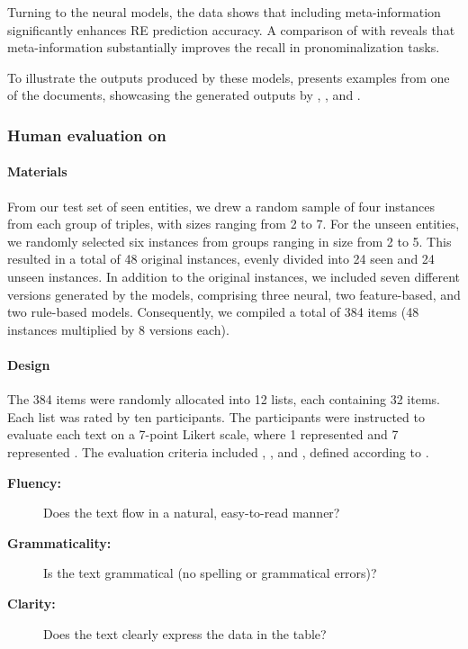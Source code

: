 

Turning to the neural models, the data shows that including meta-information significantly enhances RE prediction accuracy. A comparison of  with  reveals that meta-information substantially improves the recall in pronominalization tasks. 

To illustrate the outputs produced by these models,  presents examples from one of the \wsj documents, showcasing the generated outputs by , , and .

\subsubsection{Human evaluation on \webnlg}\label{subsubsec:webnlghum}

\paragraph*{Materials} 

From our test set of \webnlg seen entities, we drew a random sample of four instances from each group of triples, with sizes ranging from 2 to 7. For the unseen entities, we randomly selected six instances from groups ranging in size from 2 to 5. This resulted in a total of 48 original instances, evenly divided into 24 seen and 24 unseen instances. In addition to the original instances, we included seven different versions generated by the models, comprising three neural, two feature-based, and two rule-based models. Consequently, we compiled a total of 384 items (48 instances multiplied by 8 versions each).

\paragraph*{Design} The 384 items were randomly allocated into 12 lists, each containing 32 items. Each list was rated by ten participants. The participants were instructed to evaluate each text on a 7-point Likert scale, where 1 represented  and 7 represented . The evaluation criteria included , , and , defined according to \citet{ferreira2018neuralreg}.

\begin{description}
	\item[\textbf{Fluency:}] Does the text flow in a natural, easy-to-read manner?
	\item[\textbf{Grammaticality:}] Is the text grammatical (no spelling or grammatical errors)?
	\item[\textbf{Clarity:}] Does the text clearly express the data in the table?
\end{description}


